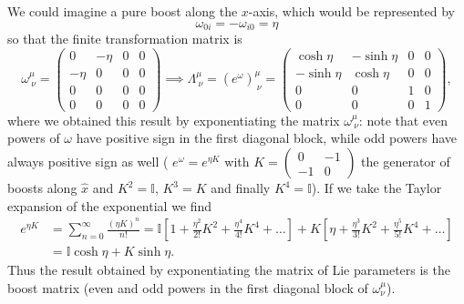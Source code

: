 \begin{example}
    We could imagine a pure boost along the \(x\)-axis, which would be represented by
    \[
        \omega_{0i} = - \omega_{i0} = \eta
    \]
    so that the finite transformation matrix is
    \[
        \omega^{\mu}_{\ \nu} = \begin{pmatrix}
            0     & -\eta & 0 & 0 \\
            -\eta & 0     & 0 & 0 \\
            0     & 0     & 0 & 0 \\
            0     & 0     & 0 & 0
        \end{pmatrix} \implies \Lambda^{\mu}_{\ \nu} = (e^{\omega})^{\mu}_{\ \nu} = \begin{pmatrix}
            \cosh{\eta}  & -\sinh{\eta} & 0 & 0 \\
            -\sinh{\eta} & \cosh{\eta}  & 0 & 0 \\
            0            & 0            & 1 & 0 \\
            0            & 0            & 0 & 1
        \end{pmatrix},
    \]
    where we obtained this result by exponentiating the matrix \(\omega^{\mu}_{\ \nu}\): note that even powers of \(\omega\) have positive sign in the first diagonal block, while odd powers have always positive sign as well ( \(e^{\omega} = e^{\eta K}\) with \(K = \begin{pmatrix}
        0  & -1 \\
        -1 & 0
    \end{pmatrix}\) the generator of boosts along \(\hat{x}\) and \(K^2 = \mathbb{I}\), \(K^3 = K\) and finally \(K^4 = \mathbb{I}\)). If we take the Taylor expansion of the exponential we find
    \[
        \begin{aligned}
            e^{\eta K} & = \sum_{n=0}^{\infty} \frac{(\eta K)^n}{n!} = \mathbb{I} \left[1 + \frac{\eta^2}{2!} K^2 + \frac{\eta^4}{4!} K^4 + \dots \right] + K \left[\eta + \frac{\eta^3}{3!} K^2 + \frac{\eta^5}{5!} K^4 + \dots \right] \\
                       & = \mathbb{I}\cosh{\eta} + K\sinh{\eta}.
        \end{aligned}
    \]
    Thus the result obtained by exponentiating the matrix of Lie parameters is the boost matrix (even and odd powers in the first diagonal block of \(\omega^{\mu}_\nu\)).


\end{example}
